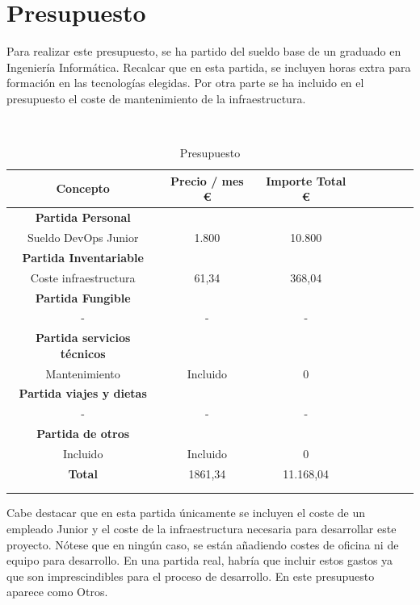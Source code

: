 \section{Presupuesto}
	\begin{paragraph}
		Para realizar este presupuesto, se ha partido del sueldo base de un graduado en Ingeniería Informática. Recalcar que en esta partida, se incluyen horas extra para formación en las tecnologías elegidas.
		Por otra parte se ha incluido en el presupuesto el coste de mantenimiento de la infraestructura.
	\end{paragraph}
	\\
	\begin{table}[ht]
		\centering
		\begin{tabular}[!hbt]{SSSSSSSS} \toprule
			{Concepto} &  {Precio / mes \euro} & {Importe Total \euro} \\ \midrule
			{\textbf{Partida Personal}} \\ \midrule
			{Sueldo DevOps Junior}  & {1.800} & {10.800}  \\
		    \midrule
			{\textbf{Partida Inventariable}} \\ \midrule
			{Coste infraestructura}  & {61,34}  & {368,04}   \\
			\midrule
			{\textbf{Partida Fungible}} \\ \midrule
			{-}  & {-}  & {-}   \\
			\midrule
			{\textbf{Partida servicios técnicos}} \\ \midrule
			{Mantenimiento}  & {Incluido}  & {0} \\
			\midrule	
			{\textbf{Partida viajes y dietas}} \\ \midrule
			{-}  & {-}  & {-} \\
			\midrule	
			{\textbf{Partida de otros}} \\ \midrule
			{Incluido}  & {Incluido}  & {0} \\
			\midrule	
			{\textbf{Total}}  & {1861,34}  & {11.168,04} \\
			\\ \midrule
		 \\ \bottomrule
		\end{tabular}
		\caption[Presupuesto]{Presupuesto \cite{presupuesto:online}} 
		\label{Presupuesto}
	\end{table}

	\begin{paragraph}
		Cabe destacar que en esta partida únicamente se incluyen el coste de un empleado Junior y el coste de la infraestructura necesaria para desarrollar este proyecto. Nótese que en ningún caso, se están añadiendo costes de oficina ni de equipo para desarrollo. En una partida real, habría que incluir estos gastos ya que son imprescindibles para el proceso de desarrollo. En este presupuesto aparece como Otros.
	\end{paragraph}
